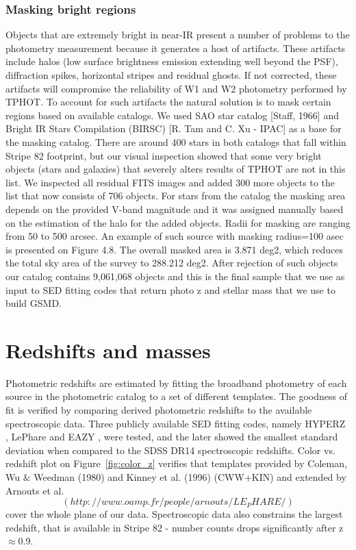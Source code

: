 \documentclass[apj,iop]{emulateapj}
\begin{document}
\subsubsection{Masking bright regions}

Objects that are extremely bright in near-IR present a number of problems to the photometry measurement because it generates a host of artifacts. These artifacts include halos (low surface brightness emission extending well beyond the PSF), diffraction spikes, horizontal stripes and residual ghosts. If not corrected, these artifacts will compromise the reliability of W1 and W2 photometry performed by TPHOT. To account for such artifacts the natural solution is to mask certain regions based on available catalogs. We used SAO star catalog [Staff, 1966] and Bright IR Stars Compilation (BIRSC) [R. Tam and C. Xu - IPAC] as a base for the masking catalog. There are around 400 stars in both catalogs that fall within Stripe 82 footprint, but our visual inspection showed that some very bright objects (stars and galaxies) that severely alters results of TPHOT are not in this list. We inspected all residual FITS images and added 300 more objects to the list that now consists of 706 objects. For stars from the catalog the masking area depends on the provided V-band magnitude and it was assigned manually based on the estimation of the halo for the added objects. Radii for masking are ranging from 50 to 500 arcsec. An example of such source with masking radius=100 asec is presented on Figure 4.8. The overall masked area is 3.871 deg2, which reduces the total sky area of the survey to 288.212 deg2.
After rejection of such objects our catalog contains 9,061,068 objects and this is the final sample that we use as input to SED fitting codes that return photo z and stellar mass that we use to build GSMD.

\section{Redshifts and masses}

Photometric redshifts are estimated by fitting the broadband photometry of each source in the photometric catalog to a set of different templates. The goodness of fit is verified by comparing derived photometric redshifts to the available spectroscopic data. Three publicly available SED fitting codes, namely HYPERZ \citep{Bolzonella2011}, LePhare \citep{Arnouts2011} and EAZY \citep{Brammer2008}, were tested, and the later showed the smallest standard deviation when compared to the SDSS DR14 spectroscopic redshifts. Color vs. redshift plot on Figure~\ref{fig:color_z} verifies that templates provided by Coleman, Wu $\&$ Weedman (1980) and Kinney et al. (1996) (CWW+KIN) and extended by Arnouts et al. $$(http://www.oamp.fr/people/arnouts/LE_PHARE/)$$ cover the whole plane of our data. Spectroscopic data also constrains the largest redshift, that is available in Stripe 82 - number counts drops significantly after z$\approx$0.9.
\end{document}
